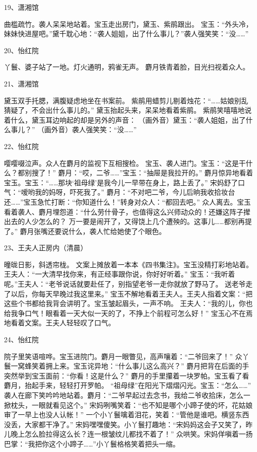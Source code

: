19、潇湘馆\par
曲槛疏竹。袭人呆呆地站着。宝玉走出房门，黛玉、紫鹃跟出。
宝玉：“外头冷，妹妹快进屋吧。”黛千耽心地：“袭人姐姐，出了什么事儿？”袭人强笑笑：“没……”

20、怡红院\par
丫鬟、婆子站了一地。灯火通明，鸦雀无声。
麝月铁青着脸，目光扫视着众人。 

21、潇湘馆\par
黛玉双手托腮，满腹疑虑地坐在书案前。
紫鹃用蜡剪儿剔着烛花：“……姑娘别乱猜疑了，不会出什么事儿的。”
黛玉抬起头来，呆呆地看着紫鹃。
紫鹃笑嘻嘻地说着什么，黛玉耳边响起的却是另外的声音：
（画外音）黛玉：“袭人姐姐，出了什么事儿？”
（画外音）袭人强笑笑：“没……”

22、怡红院\par
嘤嘤啜泣声。众人在麝月的监视下互相搜检。
宝玉、袭人进门。宝玉：“这是干什么？都别搜了！”
麝月：“哎，二爷……”宝玉：“抽屉是我拉开的。”
麝月惊异地看着宝玉。宝玉：“……那块‘祖母绿’是我今儿一早带在身上，路上丢了。”
宋妈舒了口气：“嗳哟我的妈呀，吓死我了。”
麝月：“不对吧二爷，今儿后晌我收拾妆台还……”宝玉急忙打断：“你知道什么！”转身对众人：“都回去吧。”
众人离去。宝玉看着袭人、麝月埋怨道：“什么劳什骨子，也值得这么兴师动众的！还嫌这阵子撵出去的人少怎么的？
万一要是闹开了，又得饶上几个遭殃的。这事儿……都别再提了。”
麝月张嘴还要说什么，袭人忙给她使了个眼色。

23、王夫人正房内（清晨）\par
曈昽日影，斜透帘栊。
文案上摊放着一本本《四书集注》。宝玉没精打彩地站着。
王夫人：“一大清早找你来，有正经事跟你说，你好好听着。”
宝玉：“我听着呢。”王夫人：“老爷说话就要赴任了，别指望老爷一走你就放了野马了。
送老爷走了以后，你每天早晚过我这里来。”
宝玉不解地看着王夫人。王夫人指着文案：“把这些个书都给我背会讲明了。宝玉皱起眉头，一声不响。
王夫人：“我的儿，你也给我争口气！眼看着一天大似一天的了，不挣上个前程可怎么好！”
宝玉心不在焉地看着文案。王夫人轻轻叹了口气。

24、怡红院\par
院子里笑语喧哗。宝玉进院门。麝月一眼瞥见，高声嚷着：“二爷回来了！”
众丫鬟一窝蜂笑着拥上来。宝玉诧异地：“什么事儿这么高兴？”
麝月把背在后面的手突然举到宝玉面前：“你看！这是什么？”
麝月的手里攥着一块罗帕。宝玉看了看麝月，抬起手来，轻轻打开罗帕。
“祖母绿”在阳光下熠熠闪光。宝玉：“怎么……”
袭人在廊下笑吟吟地站着。麝月：“二爷早起过去念书，我给二爷收拾床，怎么一掀枕头，一眼就看见这个。”
宋妈咧嘴笑着：“也不知是哪个小蹄子使的坏，花姑娘审了一早上也没人认帐！”
一个小丫鬟噙着泪花，笑着：“管他是谁吧。横竖东西没丢，大家都干净了。”
宋妈嘿嘿傻笑。小丫鬟打趣地：“宋妈妈这会子又笑了，昨儿晚上怎么脸拉得这么长？连一根皱纹儿都找不着了！”
众哄笑。宋妈佯嗔着一扬巴掌：“我把你这个小蹄子……”小丫鬟格格笑着把头一缩。

